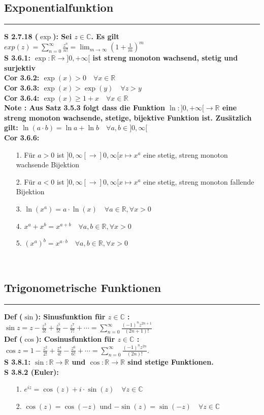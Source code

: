 \documentclass[7pt,landscape, margin = 0.1mm]{article}
\newcommand*{\mysubsection}[1]{\vspace{-2mm}\color{chaptercolor}\subsection{ #1 }
\vspace{-1mm}\hrule\vspace{1.5mm}\color{black}
\vspace{2mm}}
\newcommand{\DEF}[2]{\color{chaptercolor}\bf{Def #1}:\color{black}    \hspace{0.2cm} #2 \\}
\newcommand{\NOTE}[2]{\color{chaptercolor}\bf{Note #1}:\color{black}    \hspace{0.2cm} #2 \\}
\newcommand{\COR}[2]{\color{chaptercolor}\bf{Cor #1}:\color{black}    \hspace{0.2cm} #2 \\}
\newcommand{\SA}[2]{\color{chaptercolor}\bf{S #1}:\color{black}    \hspace{0.2cm} #2 \\}
\begin{document}
\begin{multicols}{4}
\begin{flushleft}
\mysubsection{Exponentialfunktion}
\SA{2.7.18 ($\exp$)}{Sei $z \in \mathbb{C}$. Es gilt
$ exp(z)= \sum_{n=0}^{\infty} \frac{z^n}{n!}= \lim_{m \to \infty} (1+\frac{1}{m})^m $}
\SA{3.6.1}{ $\exp:\mathbb{R} \to]0,+\infty[$ ist streng monoton wachsend, stetig und surjektiv}
\COR{3.6.2}{$\exp(x)>0 \quad \forall x \in \mathbb{R}$}
\COR{3.6.3}{$\exp(x) > \exp(y) \quad \forall z>y$}
\COR{3.6.4}{ $\exp(x) \geq 1+x \quad \forall x \in \mathbb{R}$ }
\NOTE{}{Aus Satz 3.5.3 folgt dass die Funktion $\ln:]0,+\infty[\to \mathbb{R}$ eine streng monoton wachsende, stetige, bijektive Funktion ist. Zusätzlich gilt:
$ \ln(a\cdot b)=\ln a + \ln b\quad \forall a,b \in ]0,\infty[ $}
\COR{3.6.6}{ \begin{itemize}
 \item[1.] Für $a>0$ ist $ ]0,\infty[ \to ]0,\infty[x \mapsto x^a $ eine stetig, streng monoton wachsende Bijektion
 \item[2.] Für $a<0$ ist $ ]0,\infty[ \to ]0,\infty[ x \mapsto x^a $ eine stetig, streng monoton fallende Bijektion
 \item[3.] $\ln(x^a) = a \cdot \ln(x) \quad \forall a \in \mathbb{R}, \forall x >0$
 \item[4.] $x^a+x^b = x^{a+b} \quad \forall a,b \in \mathbb{R}, \forall x >0$
 \item[5.] $(x^a)^b=x^{a\cdot b} \quad \forall a,b \in \mathbb{R}, \forall x >0$ 
\end{itemize}
 }
 \mysubsection{Trigonometrische Funktionen}
 \DEF{($\sin$)}{Sinusfunktion für $z \in \mathbb{C}$ :
$ \sin z=z-\frac{z^3}{3 !}+\frac{z^5}{5 !}-\frac{z^7}{7 !}+\cdots=\sum_{n=0}^{\infty} \frac{(-1)^n z^{2 n+1}}{(2 n+1) !} $}
\DEF{ ($\cos$)}{Cosinusfunktion für $z \in \mathbb{C}$ :
$ \cos z=1-\frac{z^2}{2 !}+\frac{z^4}{4 !}-\frac{z^6}{6 !}+\cdots=\sum_{n=0}^{\infty} \frac{(-1)^n z^{2 n}}{(2 n) !} . $}
\SA{3.8.1}{$\sin : \mathbb{R} \longrightarrow \mathbb{R}$ und $\cos : \mathbb{R} \longrightarrow \mathbb{R}$ sind stetige Funktionen.}
\SA{3.8.2 (Euler)}{
\begin{itemize}


\item[1.] $e^{iz} = \cos(z)+i\cdot \sin(z) \quad \forall z \in \mathbb{C}$
\item[2.] $\cos(z) = \cos(-z)$
     und $-\sin(z) = \sin(-z) \quad \forall z \in \mathbb{C}$
     

\end{itemize}}
\end{flushleft}
\end{multicols}
\end{document}
